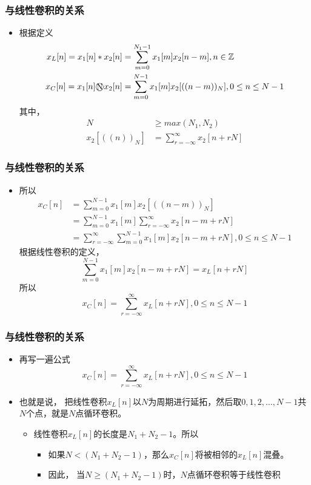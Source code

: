 \documentclass[CJKutf8,dvipsnames,table]{beamer}
\begin{document}
\begin{CJK*}{UTF8}{song}
  \begin{frame}
    \frametitle{与线性卷积的关系}
    \begin{itemize}
    \item 根据定义
    \begin{align*}
	    x_L[n] = x_1[n] \ast x_2[n] & = \sum_{m=0}^{N_1-1}x_1[m]x_2[n-m], n \in \mathbb{Z}    \\ 	
	    x_C[n] = x_1[n] \raisebox{0pt}{\textcircled{\raisebox{-.9pt}{N}}} x_2[n] & = \sum_{m=0}^{N-1}x_1[m]x_2[((n-m))_N], 0 \leq n \leq N-1 	    
    \end{align*}
    其中，
    \begin{align*}
	    N & \geq max(N_1, N_2) \\
	    x_2[((n))_N] & = \sum_{r=-\infty}^{\infty} x_2[n+rN]
	\end{align*}
	\end{itemize}
  \end{frame} 
  
  \begin{frame}
    \frametitle{与线性卷积的关系}
    \begin{itemize}
    \item 所以
    \begin{align*}
	    x_C[n] & = \sum_{m=0}^{N-1}x_1[m]x_2[((n-m))_N] 	\\    
	    & = \sum_{m=0}^{N-1}x_1[m]\sum_{r=-\infty}^{\infty} x_2[n-m+rN] \\
	    & = \sum_{r=-\infty}^{\infty} \sum_{m=0}^{N-1}x_1[m] x_2[n-m+rN], 0 \leq n \leq N-1 	    
    \end{align*}
    根据线性卷积的定义，
    \[
    \sum_{m=0}^{N-1}x_1[m] x_2[n-m+rN] = x_L[n+rN]
    \]
    所以
	\[
		x_C[n] = \sum_{r=-\infty}^{\infty} x_L[n+rN], 0 \leq n \leq N-1
	\]
	\end{itemize}
  \end{frame}   
  
  \begin{frame}
    \frametitle{与线性卷积的关系}
    \begin{itemize}
    \item 再写一遍公式
    \[
		x_C[n] = \sum_{r=-\infty}^{\infty} x_L[n+rN], 0 \leq n \leq N-1
	\]
    \item 也就是说，{\color{red} 把线性卷积$x_L[n]$以$N$为周期进行延拓，然后取$0, 1, 2, \hdots, N-1$共$N$个点，就是$N$点循环卷积。}
    	\begin{itemize}
    	\item 线性卷积$x_L[n]$的长度是$N_1+N_2-1$。所以
			\begin{itemize}
    		\item 如果$N < (N_1+N_2-1)$，那么$x_C[n]$将被相邻的$x_L[n]$混叠。
			\item 因此，{\color{red} 当$N \geq (N_1+N_2-1)$时，$N$点循环卷积等于线性卷积}
			\end{itemize}
    	\end{itemize}


\end{itemize}
\end{frame}
\end{CJK*}
\end{document}

